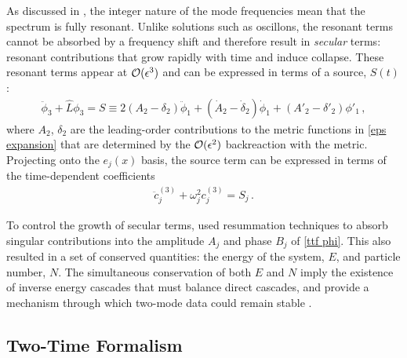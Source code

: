\documentclass[../PhD.tex]{subfiles}
\begin{document}
As discussed in \cite{1412.3249, 1407.6273, 1508.04943}, the integer nature of the mode frequencies mean that the spectrum is fully resonant. Unlike solutions such as oscillons, the resonant terms cannot be absorbed by a frequency shift and therefore result in \emph{secular} terms: resonant contributions that grow rapidly with time and induce collapse. These resonant terms appear at $\mathcal O (\epsilon^3)$ and can be expressed in terms of a source, $S(t)$:
\begin{align}
\ddot \phi_3 + \hat L \phi_3 = S \equiv 2 (A_2 - \delta_2) \ddot \phi_1 + ( \dot A_2 - \dot \delta_2 ) \dot \phi_1 + (A'_2 - \delta'_2) \phi'_1 \, ,
\end{align}
where $A_2$, $\delta_2$ are the leading-order contributions to the metric functions in \eqref{eps expansion} that are determined by the $\mathcal O(\epsilon^2)$ backreaction with the metric. Projecting onto the $e_j(x)$ basis, the source term can be expressed in terms of the time-dependent coefficients
\begin{align}
\ddot c_j^{(3)} + \omega_j^2 c_j^{(3)} = S_j \, .
\end{align}  

To control the growth of secular terms, \cite{1412.3249} used resummation techniques to absorb singular contributions into the amplitude $A_j$ and phase $B_j$ of \eqref{ttf phi}. This also resulted in a set of conserved quantities: the energy of the system, $E$, and particle number, $N$. The simultaneous conservation of both $E$ and $N$ imply the existence of inverse energy cascades that must balance direct cascades, and provide a mechanism through which two-mode data could remain stable \cite{1412.4761}.


\subsection{Two-Time Formalism}
\end{document}

